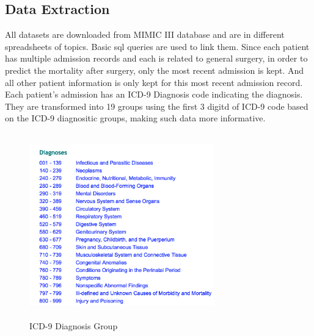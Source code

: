 \documentclass[twoside,11pt]{article}
\begin{document}
\subsection{Data Extraction} 
All datasets are downloaded from MIMIC III database and are in different spreadsheets of topics. Basic sql queries are used to link them. Since each patient has multiple admission records and each is related to general surgery, in order to predict the mortality after surgery, only the most recent admission is kept. And all other patient information is only kept for this most recent admission record. Each patient's admission has an ICD-9 Diagnosis code indicating the diagnosis. They are transformed into 19 groups using the first 3 digitd of ICD-9 code based on the ICD-9 diagnositic groups, making such data more informative.

\begin{figure}[htbp]
  \centering 
  \includegraphics[height=8cm, width=8cm]{fig4}
  \caption{ICD-9 Diagnosis Group}
  \label{fig4} 
\end{figure} 
\end{document}
